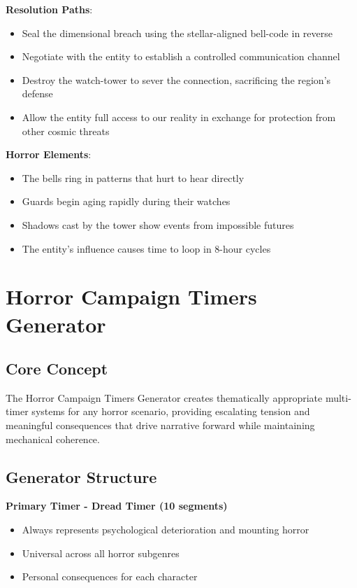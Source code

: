 \documentclass[11pt]{article}
\begin{document}
\begin{mdframed}[backgroundcolor=horrorbg]
\textbf{Resolution Paths}:
\begin{itemize}[leftmargin=*]
\item Seal the dimensional breach using the stellar-aligned bell-code in reverse
\item Negotiate with the entity to establish a controlled communication channel
\item Destroy the watch-tower to sever the connection, sacrificing the region's defense
\item Allow the entity full access to our reality in exchange for protection from other cosmic threats
\end{itemize}

\textbf{Horror Elements}:
\begin{itemize}[leftmargin=*]
\item The bells ring in patterns that hurt to hear directly
\item Guards begin aging rapidly during their watches
\item Shadows cast by the tower show events from impossible futures
\item The entity's influence causes time to loop in 8-hour cycles
\end{itemize}
\end{mdframed}

\section{Horror Campaign Timers Generator}

\subsection{Core Concept}

The Horror Campaign Timers Generator creates thematically appropriate multi-timer systems for any horror scenario, providing escalating tension and meaningful consequences that drive narrative forward while maintaining mechanical coherence.

\subsection{Generator Structure}

\textbf{Primary Timer - Dread Timer (10 segments)}
\begin{itemize}
\item Always represents psychological deterioration and mounting horror
\item Universal across all horror subgenres
\item Personal consequences for each character
\end{itemize}
\end{document}
